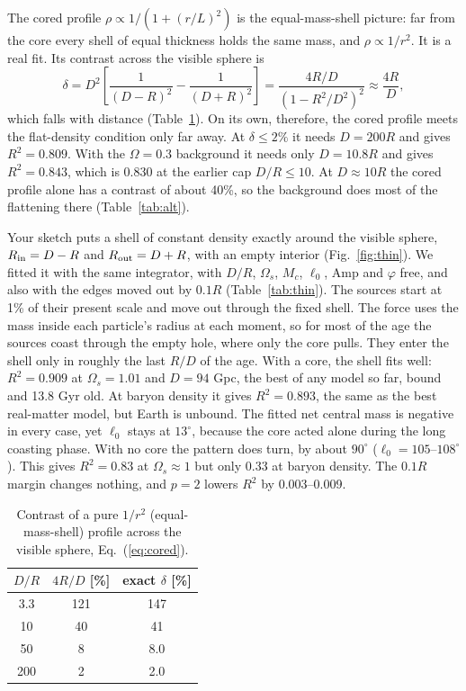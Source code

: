 \documentclass[10pt,letterpaper]{article}
\begin{document}
The cored profile $\rho\propto1/(1+(r/L)^2)$ is the equal-mass-shell picture: far from the core every shell of equal thickness holds the same mass, and $\rho\propto1/r^2$. It is a real fit. Its contrast across the visible sphere is
\begin{equation}\label{eq:cored}
\delta=D^2\left[\frac{1}{(D-R)^2}-\frac{1}{(D+R)^2}\right]=\frac{4R/D}{\left(1-R^2/D^2\right)^2}\approx\frac{4R}{D},
\end{equation}
which falls with distance (Table~\ref{tab:cored}). On its own, therefore, the cored profile meets the flat-density condition only far away. At $\delta\le2\%$ it needs $D=200R$ and gives $R^2=0.809$. With the $\Omega=0.3$ background it needs only $D=10.8R$ and gives $R^2=0.843$, which is 0.830 at the earlier cap $D/R\le10$. At $D\approx10R$ the cored profile alone has a contrast of about 40\%, so the background does most of the flattening there (Table~\ref{tab:alt}).

Your sketch puts a shell of constant density exactly around the visible sphere, $R_{\rm in}=D-R$ and $R_{\rm out}=D+R$, with an empty interior (Fig.~\ref{fig:thin}). We fitted it with the same integrator, with $D/R$, $\Omega_s$, $M_c$, $\ell_0$, Amp and $\varphi$ free, and also with the edges moved out by $0.1R$ (Table~\ref{tab:thin}). The sources start at 1\% of their present scale and move out through the fixed shell. The force uses the mass inside each particle's radius at each moment, so for most of the age the sources coast through the empty hole, where only the core pulls. They enter the shell only in roughly the last $R/D$ of the age. With a core, the shell fits well: $R^2=0.909$ at $\Omega_s=1.01$ and $D=94$ Gpc, the best of any model so far, bound and 13.8 Gyr old. At baryon density it gives $R^2=0.893$, the same as the best real-matter model, but Earth is unbound. The fitted net central mass is negative in every case, yet $\ell_0$ stays at $13^\circ$, because the core acted alone during the long coasting phase. With no core the pattern does turn, by about $90^\circ$ ($\ell_0=105$--$108^\circ$). This gives $R^2=0.83$ at $\Omega_s\approx1$ but only 0.33 at baryon density. The $0.1R$ margin changes nothing, and $p=2$ lowers $R^2$ by 0.003--0.009.

\begin{table}[H]\centering\small
\caption{Contrast of a pure $1/r^2$ (equal-mass-shell) profile across the visible sphere, Eq.~(\ref{eq:cored}).}\label{tab:cored}
\begin{tabular}{ccc}\toprule
$D/R$ & $4R/D$ [\%] & exact $\delta$ [\%]\\\midrule
3.3 & 121 & 147\\ 10 & 40 & 41\\ 50 & 8 & 8.0\\ 200 & 2 & 2.0\\\bottomrule
\end{tabular}\end{table}
\end{document}
